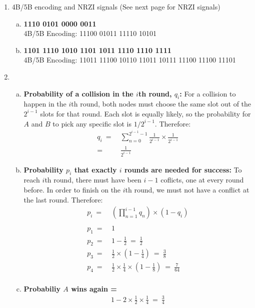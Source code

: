 \documentclass[11pt]{article}
\begin{document}
\begin{enumerate}[1.]
\item %
4B/5B encoding and NRZI signals
(See next page for NRZI signals)
  \begin{enumerate}[(a)]
  \item \textbf{1110 0101 0000 0011}  \\
  4B/5B Encoding: 11100 01011 11110 10101
  \item \textbf{1101 1110 1010 1101 1011 1110 1110 1111} \\
  4B/5B Encoding: 11011 11100 10110 11011 10111 11100 11100 11101
  \end{enumerate}

\addtocounter{enumi}{2}
\item %
  \begin{enumerate}[(a)]
  \item \textbf{Probability of a collision in the $i$th round, $q_i$: }
  For a collision to happen in the $i$th round, both nodes must choose the same slot out of the $2^{i-1}$ slots for that round.
  Each slot is equally likely, so the probability for $A$ and $B$ to pick any specific slot is $1/2^{i-1}$. Therefore:
    \begin{align*}
    q_i \ =&\ \sum_{n=0}^{2^{i-1}-1} \frac{1}{2^{i-1}} \times \frac{1}{2^{i-1}} \\
    =&\ \frac{1}{2^{i-1}}
    \end{align*}
  \item \textbf{Probability $p_i$ that exactly $i$ rounds are needed for success:} To reach $i$th round, there must have been $i-1$ coflicts, one at every round before. In order to finish on the $i$th round, we must not have a conflict at the last round. Therefore:
    \begin{align*}
    p_i \ =&\ \left(\prod_{n=1}^{i-1}q_n\right)\times(1-q_i)\\ \\
    p_1 \ =&\ 1 \\
    p_2 \ =&\ 1 - \frac{1}{2}\ =\ \frac{1}{2} \\ 
    p_3 \ =&\ \frac{1}{2} \times \left(1-\frac{1}{4}\right) \ =\ \frac{3}{8}\\
    p_4 \ =&\ \frac{1}{2} \times \frac{1}{4} \times \left(1-\frac{1}{8}\right) \ =\ \frac{7}{64}\\
    \end{align*}
  \item \textbf{Probabiliy $A$ wins again =}
    \begin{align*}
    1 - 2\times\frac{1}{2}\times\frac{1}{4} \ =\ \frac{3}{4}

\end{align*}
\end{enumerate}
\end{enumerate}
\end{document}
